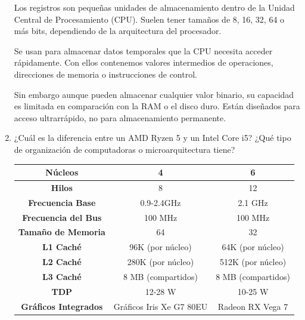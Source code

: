 \documentclass[12pt,letterpaper]{article}
\begin{document}
\begin{enumerate}
  Los registros son pequeñas unidades de almacenamiento dentro de la Unidad Central de Procesamiento (CPU). Suelen tener tamaños de 8, 16, 32, 64 o más bits, dependiendo de la arquitectura del procesador.

  Se usan para almacenar datos temporales que la CPU necesita acceder rápidamente. Con ellos contenemos valores intermedios de operaciones, direcciones de memoria o instrucciones de control.
  
  Sin embargo aunque pueden almacenar cualquier valor binario, su capacidad es limitada en comparación con la RAM o el disco duro. Están diseñados para acceso ultrarrápido, no para almacenamiento permanente.
  \bigskip
  
\item ¿Cuál es la diferencia entre un AMD Ryzen 5 y un Intel Core i5? ¿Qué tipo de organización de computadoras o microarquitectura tiene?
  \bigskip

  \begin{table}[H]
    \begin{center}
      \begin{tabular}{| c | c | c |}
        
        \hline
        
        \textbf{Núcleos}             & 4 & 6\\ \hline
        \textbf{Hilos}               & 8 & 12\\ \hline
        \textbf{Frecuencia Base}     & 0.9-2.4GHz & 2.1 GHz\\ \hline
        \textbf{Frecuencia del Bus}  & 100 MHz & 100 MHz\\ \hline
        \textbf{Tamaño de Memoria}   & 64 & 32\\ \hline
        \textbf{L1 Caché}            & 96K (por núcleo) & 64K (por núcleo)\\ \hline
        \textbf{L2 Caché}            & 280K (por núcleo) & 512K (por núcleo)\\ \hline
        \textbf{L3 Caché}            & 8 MB (compartidos) & 8 MB (compartidos)\\ \hline
        \textbf{TDP}                 & 12-28 W & 10-25 W\\ \hline
        \textbf{Gráficos Integrados} & Gráficos Iris Xe G7 80EU & Radeon RX Vega 7\\ \hline
        
      \end{tabular}
    \end{center}
  \end{table}


\end{enumerate}
\end{document}

